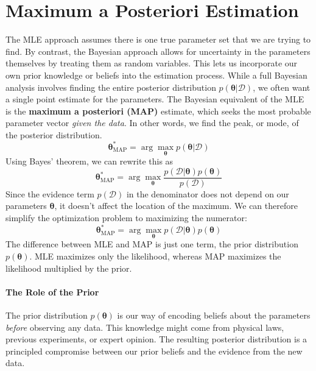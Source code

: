 \section{Maximum a Posteriori Estimation}
The MLE approach assumes there is one true parameter set that we are trying to find. By contrast, the Bayesian approach allows for uncertainty in the parameters themselves by treating them as random variables. This lets us incorporate our own prior knowledge or beliefs into the estimation process. While a full Bayesian analysis involves finding the entire posterior distribution $p(\boldsymbol{\theta}|\mathcal{D})$, we often want a single point estimate for the parameters. The Bayesian equivalent of the MLE is the \textbf{maximum a posteriori (MAP)} estimate, which seeks the most probable parameter vector \textit{given the data}. In other words, we find the peak, or mode, of the posterior distribution.
\begin{equation}
    \boldsymbol{\theta}_{\text{MAP}}^* = \arg\max_{\boldsymbol{\theta}} p(\boldsymbol{\theta}|\mathcal{D})
\end{equation}
Using Bayes' theorem, we can rewrite this as
\begin{equation}
    \boldsymbol{\theta}_{\text{MAP}}^* = \arg\max_{\boldsymbol{\theta}} \frac{p(\mathcal{D}|\boldsymbol{\theta})p(\boldsymbol{\theta})}{p(\mathcal{D})}
\end{equation}
Since the evidence term $p(\mathcal{D})$ in the denominator does not depend on our parameters $\boldsymbol{\theta}$, it doesn't affect the location of the maximum. We can therefore simplify the optimization problem to maximizing the numerator:
\begin{equation}
    \boldsymbol{\theta}_{\text{MAP}}^* = \arg\max_{\boldsymbol{\theta}} p(\mathcal{D}|\boldsymbol{\theta})p(\boldsymbol{\theta})
\end{equation}
The difference between MLE and MAP is just one term, the prior distribution $p(\boldsymbol{\theta})$. MLE maximizes only the likelihood, whereas MAP maximizes the likelihood multiplied by the prior.

\paragraph*{The Role of the Prior}
The prior distribution $p(\boldsymbol{\theta})$ is our way of encoding beliefs about the parameters \textit{before} observing any data. This knowledge might come from physical laws, previous experiments, or expert opinion. The resulting posterior distribution is a principled compromise between our prior beliefs and the evidence from the new data.

